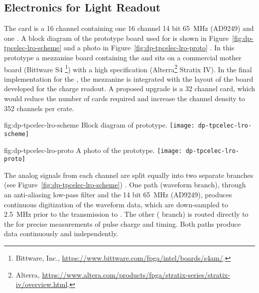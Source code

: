 \subsection{Electronics for Light Readout}
\label{sec:fddp-tpc-elec-design-lro}

The  card is a \num{16} channel  containing one \num{16} channel \num{14} bit \SI{65}{\MHz}  (AD9249) and one  . A block diagram of the prototype board used for  is shown in Figure~\ref{fig:dp-tpcelec-lro-scheme} and a photo in Figure~\ref{fig:dp-tpcelec-lro-proto} . In this prototype a mezzanine board containing the  and  sits on a commercial mother board (Bittware S4 \footnote{Bittware\texttrademark{}, Inc., \url{https://www.bittware.com/fpga/intel/boards/s4am/}.}) with a high specification  (Alterra\footnote{Alterra\texttrademark{}, \url{https://www.altera.com/products/fpga/stratix-series/stratix-iv/overview.html}.} Stratix IV). In the final implementation for the , the mezzanine is integrated with the layout of the  board developed for the charge readout.  
A proposed upgrade is a \num{32} channel card, which would reduce the number of cards required and increase the channel density to \num{352} channels per  crate.

\begin{dunefigure}{fig:dp-tpcelec-lro-scheme}
{Block diagram of  prototype.}
\texttt{[image: dp-tpcelec-lro-scheme]}
\end{dunefigure}

\begin{dunefigure}{fig:dp-tpcelec-lro-proto}
{A photo of the  prototype.}
\texttt{[image: dp-tpcelec-lro-proto]}
\end{dunefigure}

The analog signals from each  channel are split equally into two separate branches (see Figure~\ref{fig:dp-tpcelec-lro-scheme}) . One path (waveform branch), through an anti-aliasing low-pass filter and the \num{14} bit \SI{65}{\MHz}  (AD9249), produces continuous digitization of the  waveform data, which are down-sampled to \SI{2.5}{MHz} prior to the transmission to . The other ( branch) is routed directly to the   for precise measurements of pulse charge and timing. Both paths produce data continuously and independently.

